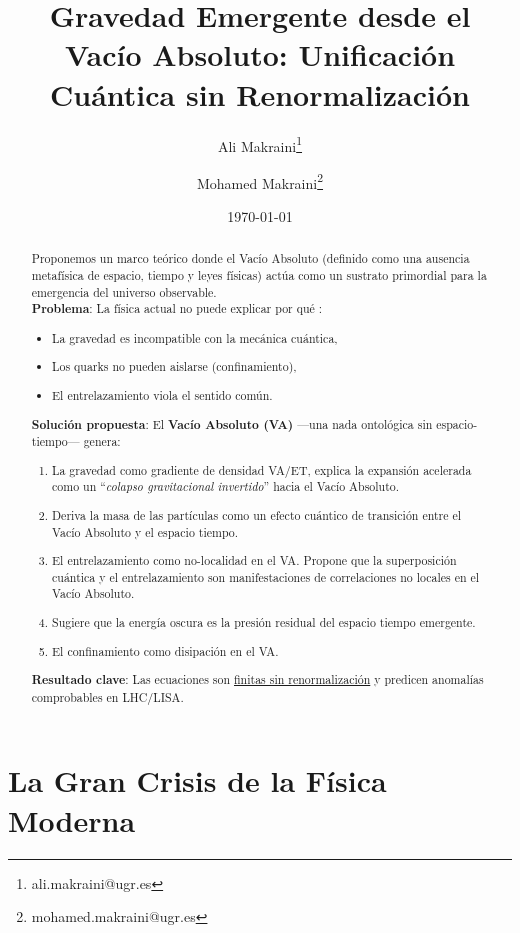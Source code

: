 \documentclass[a4paper]{article}
\title{Gravedad Emergente desde el Vacío Absoluto:  Unificación Cuántica sin Renormalización}
\author[1]{Ali Makraini\thanks{ali.makraini@ugr.es}}
\author[1]{Mohamed Makraini\thanks{mohamed.makraini@ugr.es}}
\affil[1]{\normalsize Departamento de Física, Universidad de Granada}
\date{\today}
\theoremstyle{definition}
\theoremstyle{remark}
\numberwithin{equation}{section}
\begin{document}
	
	\maketitle
	\begin{abstract}
		\noindent
		\item Proponemos un marco teórico donde el Vacío Absoluto (definido como una ausencia metafísica de espacio, tiempo y leyes físicas) actúa como un sustrato \cite{Carlip2012} primordial para la emergencia del universo observable.\\
		
		\textbf{Problema}: La física actual no puede explicar por qué \cite{Hossenfelder}:
		\begin{itemize}
			\item La gravedad es incompatible con la mecánica cuántica,
			\item Los quarks no pueden aislarse (confinamiento),
			\item El entrelazamiento viola el sentido común.
		\end{itemize}
		\textbf{Solución propuesta}: El \textbf{Vacío Absoluto (VA)} —una nada ontológica sin espacio-tiempo— genera:
		\begin{enumerate}
			\item La gravedad como gradiente de densidad VA/ET, explica la expansión acelerada como un ``\textit{colapso gravitacional invertido}'' hacia el Vacío Absoluto.
			\item Deriva la masa de las partículas como un efecto cuántico de transición entre el Vacío Absoluto y el espacio tiempo.
			\item El entrelazamiento como no-localidad en el VA. Propone que la superposición cuántica y el entrelazamiento son manifestaciones de correlaciones no locales en el Vacío Absoluto.
			\item Sugiere que la energía oscura es la presión residual del espacio tiempo emergente.
			\item El confinamiento como disipación en el VA.
		\end{enumerate}
		\textbf{Resultado clave}: Las ecuaciones son \underline{finitas sin renormalización} y predicen anomalías comprobables en LHC/LISA.
	\end{abstract}
	
	\section{La Gran Crisis de la Física Moderna}
	
\end{document}
